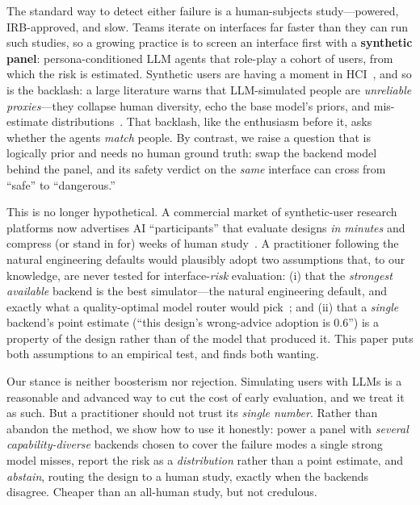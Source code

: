 \documentclass[manuscript,nonacm]{acmart}
\begin{document}
The standard way to detect either failure is a human-subjects study---powered, IRB-approved, and slow.
Teams iterate on interfaces far faster than they can run such studies, so a growing practice is to screen
an interface first with a \textbf{synthetic panel}: persona-conditioned LLM agents that role-play a cohort
of users, from which the risk is estimated. Synthetic users are having a moment in
HCI~\cite{park2022social,argyle2023out,aher2023using}, and so is the backlash: a large literature warns
that LLM-simulated people are \emph{unreliable proxies}---they collapse human diversity, echo the base
model's priors, and mis-estimate distributions~\cite{santurkar2023whose,cao2025specializing,%
bisbee2024synthetic,dominguez2024questioning,cheng2023compost,hamalainen2023evaluating}. That backlash,
like the enthusiasm before it, asks whether the agents \emph{match} people. By contrast, we raise a
question that is logically prior and needs no human ground truth: swap the backend model behind the panel,
and its safety verdict on the \emph{same} interface can cross from ``safe'' to ``dangerous.''

This is no longer hypothetical. A commercial market of synthetic-user research platforms now advertises AI
``participants'' that evaluate designs \emph{in minutes} and compress (or stand in for) weeks of human
study~\cite{syntheticusers,uxia_synthetic}. A practitioner following the natural engineering defaults would
plausibly adopt two assumptions that, to our
knowledge, are never tested for interface-\emph{risk} evaluation: (i) that the \emph{strongest available}
backend is the best simulator---the natural engineering default, and exactly what a quality-optimal model
router would pick~\cite{ong2025routellm}; and (ii) that a \emph{single} backend's point estimate
(``this design's wrong-advice adoption is 0.6'') is a property of the design rather than of the model that
produced it. This paper puts both assumptions to an empirical test, and finds both wanting.

Our stance is neither boosterism nor rejection. Simulating users with LLMs is a reasonable and advanced way
to cut the cost of early evaluation, and we treat it as such. But a practitioner should not trust its
\emph{single number}. Rather than abandon the method, we show how to use it honestly: power a panel
with \emph{several capability-diverse} backends chosen to cover the failure modes a single strong model
misses, report the risk as a \emph{distribution} rather than a point estimate, and \emph{abstain}, routing
the design to a human study, exactly when the backends disagree. Cheaper than an all-human study, but not
credulous.
\end{document}
